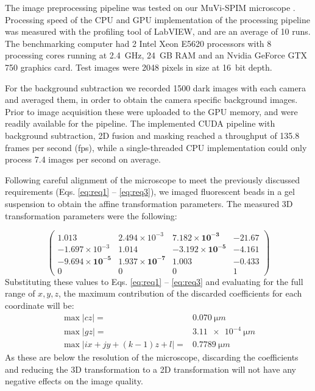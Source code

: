   The image preprocessing pipeline was tested on our MuVi-SPIM microscope \cite{krzic_multiview_2012}.   
  Processing speed of the CPU and GPU implementation of the processing pipeline was measured with the profiling tool of LabVIEW, and are an average of 10 runs. The benchmarking computer had 2 Intel Xeon E5620 processors with 8 processing cores running at \SI{2.4}{GHz}, \SI{24}{GB} RAM and an Nvidia GeForce GTX 750 graphics card. Test images were 2048 pixels in size at \SI{16}{bit} depth. 
  
  For the background subtraction we recorded 1500 dark images with each camera and averaged them, in order to obtain the camera specific background images. Prior to image acquisition these were uploaded to the GPU memory, and were readily available for the pipeline. The implemented CUDA pipeline with background subtraction, 2D fusion and masking reached a throughput of 135.8 frames per second (fps), while a single-threaded CPU implementation could only process 7.4 images per second on average.

  

  Following careful alignment of the microscope to meet the previously discussed requirements (Eqs. \ref{eq:req1} -- \ref{eq:req3}), we imaged fluorescent beads in a gel suspension to obtain the affine transformation parameters. The measured 3D transformation parameters were the following:

  \[
  \begin{pmatrix}
    1.013 & 2.494\times 10^{-3} & \mathbf{7.182\times 10^{-3}} & -21.67 \\
    -1.697\times 10^{-3} & 1.014 & \mathbf{-3.192\times 10^{-5}} & -4.161 \\
    \mathbf{-9.694\times 10^{-5}} & \mathbf{1.937\times 10^{-7}} & \mathbf{1.003} & \mathbf{-0.433} \\
    0 & 0 & 0 & 1
  \end{pmatrix}
  \]
  Substituting these values to Eqs. \ref{eq:req1} -- \ref{eq:req3} and evaluating for the full range of $x, y, z$, the maximum contribution of the discarded coefficients for each coordinate will be:
  \begin{align*}
    \max |cz| =& \SI{0.070}{\micro m}  \\
    \max |gz| =& \SI{3.11e-4}{\micro m}  \\
    \max | i x + j y + (k-1)  z + l | =& \SI{0.7789}{\micro m}
  \end{align*}
  As these are below the resolution of the microscope, discarding the coefficients and reducing the 3D transformation to a 2D transformation will not have any negative effects on the image quality.

